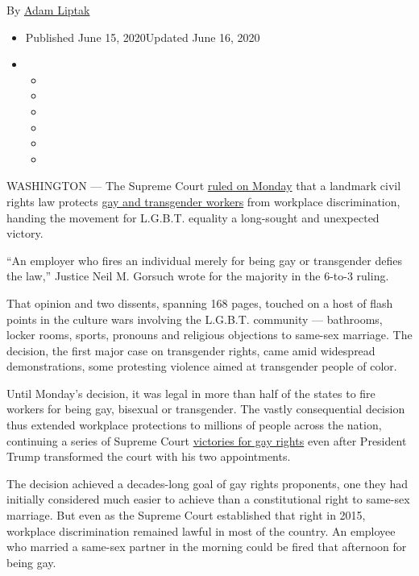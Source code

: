 By \href{https://www.nytimes.com/by/adam-liptak}{Adam Liptak}

\begin{itemize}
\item
  Published June 15, 2020Updated June 16, 2020
\item
  \begin{itemize}
  \item
  \item
  \item
  \item
  \item
  \item
  \end{itemize}
\end{itemize}

WASHINGTON --- The Supreme Court
\href{https://www.supremecourt.gov/opinions/19pdf/17-1618_hfci.pdf}{ruled
on Monday} that a landmark civil rights law protects
\href{https://www.nytimes.com/2020/06/16/podcasts/the-daily/supreme-court-lgbtq.html}{gay
and transgender workers} from workplace discrimination, handing the
movement for L.G.B.T. equality a long-sought and unexpected victory.

``An employer who fires an individual merely for being gay or
transgender defies the law,'' Justice Neil M. Gorsuch wrote for the
majority in the 6-to-3 ruling.

That opinion and two dissents, spanning 168 pages, touched on a host of
flash points in the culture wars involving the L.G.B.T. community ---
bathrooms, locker rooms, sports, pronouns and religious objections to
same-sex marriage. The decision, the first major case on transgender
rights, came amid widespread demonstrations, some protesting violence
aimed at transgender people of color.

Until Monday's decision, it was legal in more than half of the states to
fire workers for being gay, bisexual or transgender. The vastly
consequential decision thus extended workplace protections to millions
of people across the nation, continuing a series of Supreme Court
\href{https://www.nytimes.com/2015/06/27/us/supreme-court-same-sex-marriage.html}{victories
for gay rights} even after President Trump transformed the court with
his two appointments.

The decision achieved a decades-long goal of gay rights proponents, one
they had initially considered much easier to achieve than a
constitutional right to same-sex marriage. But even as the Supreme Court
established that right in 2015, workplace discrimination remained lawful
in most of the country. An employee who married a same-sex partner in
the morning could be fired that afternoon for being gay.

